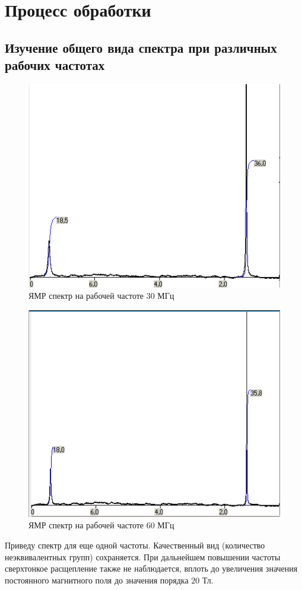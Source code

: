 \newpage
\section{Процесс обработки}
\subsection{Изучение общего вида спектра при различных рабочих частотах}
\begin{figure}[h]
	\centering
	\includegraphics[width=0.6\linewidth]{pict1}
	\caption{ЯМР спектр на рабочей частоте 30 МГц}
	\label{fig:pict1}
\end{figure}

\begin{figure}[h]
	\centering
	\includegraphics[width=0.6\linewidth]{pict2}
	\caption{ЯМР спектр на рабочей частоте 60 МГц}
	\label{fig:pict2}
\end{figure}

Приведу спектр для еще одной частоты. Качественный вид (количество неэквивалентных групп) сохраняется. При
дальнейшем повышении частоты сверхтонкое расщепление также не наблюдается, вплоть до увеличения значения постоянного магнитного поля до значения порядка $20$ Тл.

